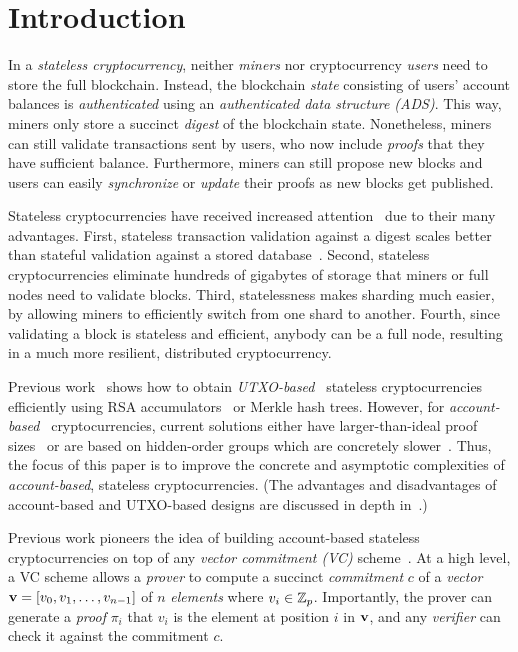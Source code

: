 \section{Introduction}

In a \textit{stateless cryptocurrency}, neither \textit{miners} nor cryptocurrency \textit{users} need to store the full blockchain.
Instead, the blockchain \textit{state} consisting of users' account balances is \textit{authenticated} using an \textit{authenticated data structure (ADS)}.
This way, miners only store a succinct \textit{digest} of the blockchain state.
Nonetheless, miners can still validate transactions sent by users, who now include \textit{proofs} that they have sufficient balance.
Furthermore, miners can still propose new blocks and users can easily \textit{synchronize} or \textit{update} their proofs as new blocks get published.

Stateless cryptocurrencies have received increased attention~\cite{ST99,Miller12,Todd16,Buterin17,Dryja19,RMCI17,CPZ18,BBF19,GRWZ20} due to their many advantages.
First, stateless transaction validation against a digest scales better than stateful validation against a stored database~\cite{CPZ18}.
Second, stateless cryptocurrencies eliminate hundreds of gigabytes of storage that miners or full nodes need to validate blocks.
Third, statelessness makes sharding much easier, by allowing miners to efficiently switch from one shard to another.
Fourth, since validating a block is stateless and efficient, anybody can be a full node, resulting in a much more resilient, distributed cryptocurrency.

Previous work~\cite{Dryja19,BBF18,CPZ18} shows how to obtain \textit{UTXO-based}~\cite{Nakamoto08} stateless cryptocurrencies efficiently using RSA accumulators~\cite{Bd93} or Merkle hash trees.
However, for \textit{account-based}~\cite{Ethereum} cryptocurrencies, current solutions either have larger-than-ideal proof sizes~\cite{CPZ18} or are based on hidden-order groups which are concretely slower~\cite{BBF18}.
Thus, the focus of this paper is to improve the concrete and asymptotic complexities of \textit{account-based}, stateless cryptocurrencies.
(The advantages and disadvantages of account-based and UTXO-based designs are discussed in depth in~\cite{Zah18,Buterin16,Cor16,Dai17,Eth17,Yangrui16}.)

Previous work pioneers the idea of building account-based stateless cryptocurrencies on top of any \textit{vector commitment (VC)} scheme~\cite{CPZ18}.
At a high level, a VC scheme allows a \textit{prover}  to compute a succinct \textit{commitment} $c$ of a \textit{vector} $\bm{\mathrm{v}}=[v_0, v_1, \dots, v_{n-1}]$ of  $n$ \textit{elements} where $v_i\in \mathbb{Z}_p$.
Importantly, the prover can generate a \textit{proof} $\pi_i$ that $v_i$ is the element at position $i$ in $\bm{\mathrm{v}}$, and any \textit{verifier} can check it against the commitment $c$.

